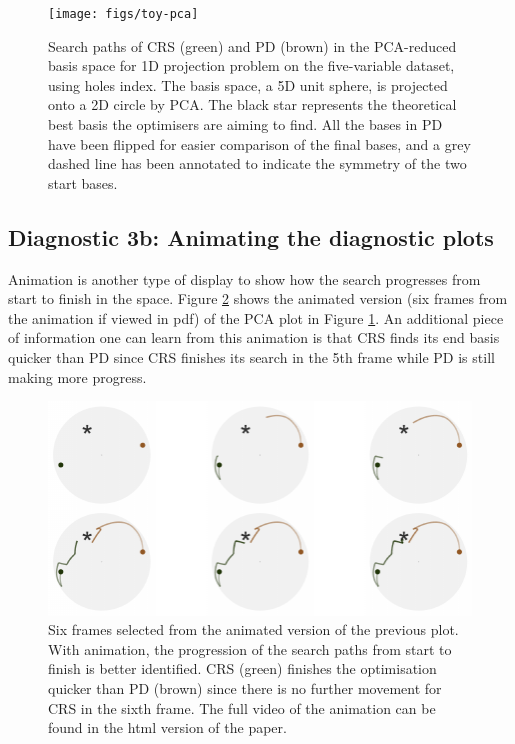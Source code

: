 \begin{figure}

{\centering \texttt{[image: figs/toy-pca]} 

}

\caption{Search paths of CRS (green) and PD (brown) in the PCA-reduced basis space for 1D projection problem on the five-variable dataset,  using holes index. The basis space, a 5D unit sphere, is projected onto a 2D circle by PCA. The black star represents the theoretical best basis the optimisers are aiming to find. All the bases in PD have been flipped for easier comparison of the final bases, and a grey dashed line has been annotated to indicate the symmetry of the two start bases.}\label{fig:toy-pca}
\end{figure}

\hypertarget{diagnostic-3b-animating-the-diagnostic-plots}{%
\subsection{Diagnostic 3b: Animating the diagnostic plots}\label{diagnostic-3b-animating-the-diagnostic-plots}}

Animation is another type of display to show how the search progresses from start to finish in the space. Figure \ref{fig:toy-pca-animated} shows the animated version (six frames from the animation if viewed in pdf) of the PCA plot in Figure \ref{fig:toy-pca}. An additional piece of information one can learn from this animation is that CRS finds its end basis quicker than PD since CRS finishes its search in the 5th frame while PD is still making more progress.

\begin{figure}

{\centering \includegraphics[width=1\linewidth]{figs/toy-pca-animated-1} 

}

\caption{Six frames selected from the animated version of the previous plot. With animation, the progression of the search paths from start to finish is better identified. CRS (green) finishes the optimisation quicker than PD (brown) since there is no further movement for CRS in the sixth frame. The full video of the animation can be found in the html version of the paper.}\label{fig:toy-pca-animated}
\end{figure}

